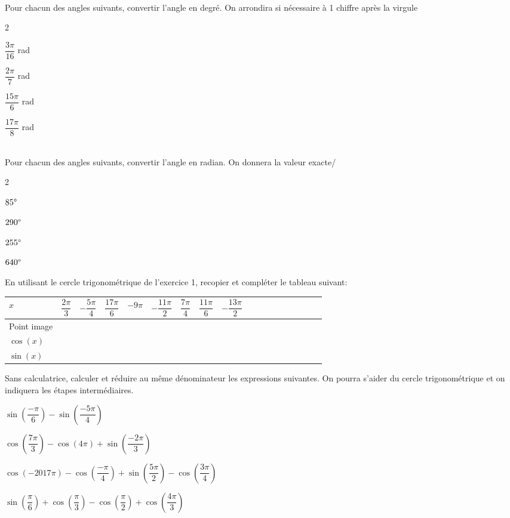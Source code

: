 \documentclass[11pt,a4paper]{article}  %
\begin{document}
\\
Pour chacun des angles suivants, convertir l'angle en degré. On arrondira si nécessaire à 1 chiffre après la virgule
\begin{multicols}{2}
	\begin{enumMet}
		\item $\dfrac{3\pi}{16}$ rad
		\item $\dfrac{2\pi}{7}$ rad
		\item $\dfrac{15\pi}{6}$ rad
		\item $\dfrac{17\pi}{8}$ rad
	\end{enumMet}
\end{multicols}

\\
Pour chacun des angles suivants, convertir l'angle en radian. On donnera la valeur exacte/
\begin{multicols}{2}
	\begin{enumMet}
		\item $85\degree$
		\item $290\degree$
		\item $255\degree$
		\item $640\degree$
	\end{enumMet}
\end{multicols}


En utilisant le cercle trigonométrique de l'exercice 1, recopier et compléter le tableau suivant:\\
\begin{tabular}{ | Xc | Xc | Xc | Xc | Xc | Xc | Xc | Xc | Xc |}
	\hline
	$x$  & $\dfrac{2\pi}{3}$ & $-\dfrac{5\pi}{4}$ & $\dfrac{17\pi}{6}$ &  $-9\pi$ & $-\dfrac{11\pi}{2}$ & $\dfrac{7\pi}{4}$ & $\dfrac{11\pi}{6}$ &  $-\dfrac{13\pi}{2}$\\ \hline
	Point image  &   &   &   &   &   & & & \\ \hline
	$\cos(x)$  &   &   &   &   &   & & & \\ \hline
	$\sin(x)$ &   &   &   &   &   & & & \\
	\hline  
\end{tabular}

\exercice{}

Sans calculatrice, calculer et réduire au même dénominateur les expressions suivantes. On pourra s'aider du cercle trigonométrique et on indiquera les étapes intermédiaires.
\begin{enumMet}
	\item $\sin \left(\dfrac{-\pi}{6}\right)-\sin \left(\dfrac{-5 \pi}{4}\right)$
	\item $\cos \left(\dfrac{7 \pi}{3}\right)-\cos (4 \pi)+\sin \left(\dfrac{-2\pi}{3}\right)$
	\item $\cos (-2017 \pi)-\cos \left(\dfrac{-\pi}{4}\right)+\sin \left(\dfrac{5 \pi}{2}\right)-\cos \left(\dfrac{3\pi}{4}\right)$
	\item $\sin \left(\dfrac{\pi}{6}\right)+\cos \left(\dfrac{\pi}{3}\right)-\cos \left(\dfrac{\pi}{2}\right)+\cos \left(\dfrac{4 \pi}{3}\right)$
\end{enumMet}
\end{document}
